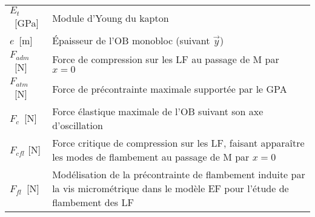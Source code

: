 \begin{table}
\begin{tabular}{l m{12cm}}
$E_t$~[GPa]    & Module d'Young du kapton \\
$e$~[m]         & Épaisseur de l'OB monobloc (suivant $\vec{y}$) \\  \cline{1-1}
$F_{adm}$~[N]      & Force de compression sur les LF au passage de M par $x=0$    \\
$F_{atm}$~[N]      & Force de précontrainte maximale supportée par le GPA  \\
$F_{c}$~[N]        & Force élastique maximale de l'OB suivant son axe d'oscillation \\
$F_{cfl}$ [N]      & Force critique de compression sur les LF, faisant apparaître les modes de flambement au passage de M par $x=0$    \\
$F_{fl}$~[N]          & Modélisation de la précontrainte de flambement induite par la vis micrométrique dans le modèle EF pour l'étude de flambement des LF \\



     \end{tabular}
\end{table}

